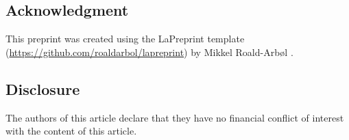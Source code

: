 \subsection{Acknowledgment}
This preprint was created using the LaPreprint template (\url{https://github.com/roaldarbol/lapreprint}) by Mikkel Roald-Arb\o l \textsuperscript{}.

\subsection{Disclosure}
The authors of this article declare that they have no financial conflict of interest with the content of this article.

